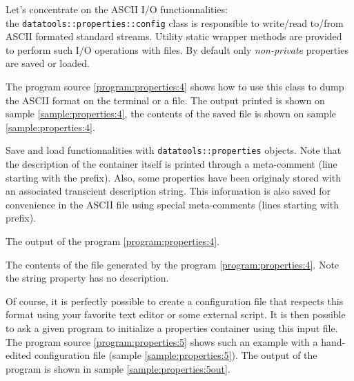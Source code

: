 \pn  Let's  concentrate on  the  ASCII  I/O  functionnalities: \\  the
\texttt{datatools::properties::config} class  is responsible to
write/read  to/from ASCII formated  standard streams.   Utility static
wrapper  methods are  provided  to perform  such  I/O operations  with
files.  By default  only  \emph{non-private} properties  are saved  or
loaded.

The program source  \ref{program:properties:4} shows how to use
this class to dump the ASCII format on the terminal or
a file. The  output   printed  is  shown   on  sample
\ref{sample:properties:4}, the contents of the saved file
is shown on sample \ref{sample:properties:4}.


\begin{program}[h]
\caption{Save        and       load        functionnalities       with
  \texttt{datatools::properties}   objects.    Note  that   the
  description   of  the   container  itself   is  printed   through  a
  meta-comment (line starting  with the  prefix).  Also,
  some  properties  have  been  originaly stored  with  an  associated
  transcient description  string. This  information is also  saved for
  convenience  in the  ASCII file  using special  meta-comments (lines
  starting with  prefix).}
\label{program:properties:4}
\end{program}


\begin{sample}[h]
\caption{The output of the program \ref{program:properties:4}.}
\label{sample:properties:4}
\end{sample}

\begin{sample}[h]
\caption{The   contents  of   the  file   generated  by   the  program
  \ref{program:properties:4}.  Note the  string property  has
  no description.}
\label{sample:properties:4}
\end{sample}

Of course,  it is  perfectly possible to  create a  configuration file
that  respects this  format using  your  favorite text  editor or  some
external  script.  It  is  then possible  to  ask a  given program  to
initialize a properties container  using this input file.  The program
source  \ref{program:properties:5}  shows   such  an  example  with  a
hand-edited  configuration  file  (sample  \ref{sample:properties:5}).
The    output     of    the    program    is     shown    in    sample
\ref{sample:properties:5out}.

